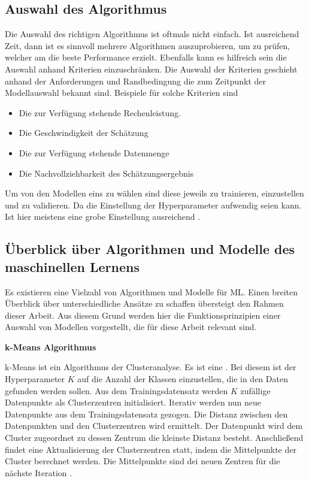  \subsection{Auswahl des Algorithmus} \label{sec:ML ModellSelect}
 Die Auswahl des richtigen Algorithmus ist oftmals nicht einfach. Ist ausreichend Zeit, dann ist es sinnvoll mehrere Algorithmen auszuprobieren, um zu prüfen, welcher am die beste Performance erzielt. Ebenfalls kann es hilfreich sein die Auswahl anhand Kriterien einzuschränken. Die Auswahl der Kriterien geschieht anhand der Anforderungen und Randbedingung die zum Zeitpunkt der Modellauswahl bekannt sind. Beispiele für solche Kriterien sind

 \begin{itemize}
     \item Die zur Verfügung stehende Rechenleistung.
     \item Die Geschwindigkeit der Schätzung
     \item Die zur Verfügung stehende Datenmenge
     \item Die Nachvollziehbarkeit des Schätzungsergebnis
 \end{itemize}

 Um von den Modellen eins zu wählen sind diese jeweils zu trainieren, einzustellen und zu validieren. Da die Einstellung der \gls{Hyperparameter} aufwendig seien kann. Ist hier meistens eine grobe Einstellung ausreichend \cite{Burkov.2019, Geron.2019}.

\subsection{Überblick über Algorithmen und Modelle des maschinellen Lernens} \label{sec:ML Algorithmen}
Es existieren eine Vielzahl von Algorithmen und Modelle für \gls{ML}. Einen breiten Überblick über unterschiedliche Ansätze zu schaffen übersteigt den Rahmen dieser Arbeit. Aus diesem Grund werden hier die Funktionsprinzipien einer Auswahl von Modellen vorgestellt, die für diese Arbeit relevant sind. 

\textbf{k-Means Algorithmus} \par
k-Means ist ein Algorithmus der Clusteranalyse. Es ist eine . Bei diesem ist der \gls{Hyperparameter} \(K\) auf die Anzahl der Klassen einzustellen, die in den Daten gefunden werden sollen. Aus dem \gls{Trainingsdatensatz} werden \(K\) zufällige Datenpunkte als Clusterzentren initialisiert. Iterativ werden nun neue Datenpunkte aus dem \gls{Trainingsdatensatz} gezogen. Die Distanz zwischen den Datenpunkten und den Clusterzentren wird ermittelt. Der Datenpunkt wird dem Cluster zugeordnet zu dessen Zentrum die kleinste Distanz besteht. Anschließend findet eine Aktualisierung der Clusterzentren statt, indem die Mittelpunkte der Cluster berechnet werden. Die Mittelpunkte sind dei neuen Zentren für die nächste Iteration \cite{Burkov.2019, Goodfellow.2016, Duda.2001}. \dubpar


